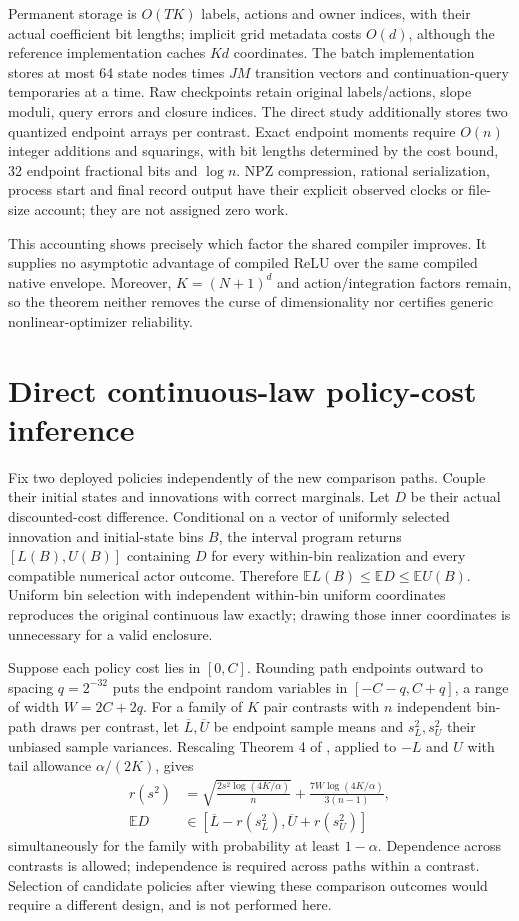 Permanent storage is $O(TK)$ labels, actions and owner indices, with their actual coefficient bit lengths; implicit grid metadata costs $O(d)$, although the reference implementation caches $Kd$ coordinates. The batch implementation stores at most 64 state nodes times $JM$ transition vectors and continuation-query temporaries at a time. Raw checkpoints retain original labels/actions, slope moduli, query errors and closure indices. The direct study additionally stores two quantized endpoint arrays per contrast. Exact endpoint moments require $O(n)$ integer additions and squarings, with bit lengths determined by the cost bound, 32 endpoint fractional bits and $\log n$. NPZ compression, rational serialization, process start and final record output have their explicit observed clocks or file-size account; they are not assigned zero work.

This accounting shows precisely which factor the shared compiler improves. It supplies no asymptotic advantage of compiled ReLU over the same compiled native envelope. Moreover, $K=(N+1)^d$ and action/integration factors remain, so the theorem neither removes the curse of dimensionality nor certifies generic nonlinear-optimizer reliability.

\section{Direct continuous-law policy-cost inference}\label{supp:direct47}
Fix two deployed policies independently of the new comparison paths. Couple their initial states and innovations with correct marginals. Let $D$ be their actual discounted-cost difference. Conditional on a vector of uniformly selected innovation and initial-state bins $B$, the interval program returns $[L(B),U(B)]$ containing $D$ for every within-bin realization and every compatible numerical actor outcome. Therefore
$\mathbb E L(B)\le\mathbb E D\le\mathbb E U(B)$. Uniform bin selection with independent within-bin uniform coordinates reproduces the original continuous law exactly; drawing those inner coordinates is unnecessary for a valid enclosure.

Suppose each policy cost lies in $[0,C]$. Rounding path endpoints outward to spacing $q=2^{-32}$ puts the endpoint random variables in $[-C-q,C+q]$, a range of width $W=2C+2q$. For a family of $K$ pair contrasts with $n$ independent bin-path draws per contrast, let $\overline L,\overline U$ be endpoint sample means and $s_L^2,s_U^2$ their unbiased sample variances. Rescaling Theorem 4 of \citet{maurer2009}, applied to $-L$ and $U$ with tail allowance $\alpha/(2K)$, gives
\begin{align*}
 r(s^2)&=\sqrt{\frac{2s^2\log(4K/\alpha)}n}
           +\frac{7W\log(4K/\alpha)}{3(n-1)},\\
 \mathbb E D&\in[\overline L-r(s_L^2),\overline U+r(s_U^2)]
\end{align*}
simultaneously for the family with probability at least $1-\alpha$. Dependence across contrasts is allowed; independence is required across paths within a contrast. Selection of candidate policies after viewing these comparison outcomes would require a different design, and is not performed here.

